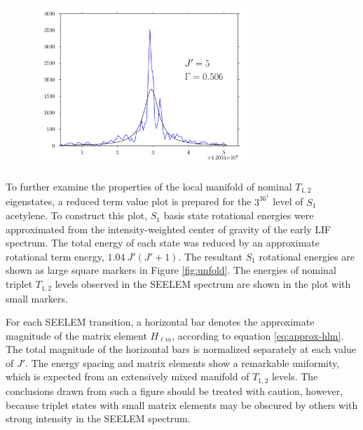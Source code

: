 \documentclass[12pt]{mitthesis}
\begin{document}
\begin{figure}
  \includegraphics[width=3.2in]{3361-q5-seelemfit}
\end{figure}


To further examine the properties of the local manifold of nominal
$T_{1,2}$ eigenstates, a reduced term value plot is prepared for the
$3^36^1$  level of $S_1$ acetylene.  To construct this plot,
$S_1$ basis state rotational energies were approximated from the
intensity-weighted center of gravity of the early LIF spectrum.  The
total energy of each state was reduced by an approximate rotational
term energy, $1.04 \: J'(J'+1)$.  The resultant $S_1$ rotational
energies are shown as large square markers in Figure \ref{fig:unfold}.
The energies of nominal triplet $T_{1,2}$ levels observed in the
SEELEM spectrum are shown in the plot with small markers.

For each SEELEM transition, a horizontal bar denotes the approximate
magnitude of the matrix element $H_{\ell m}$, according to equation
\ref{eq:approx-hlm}.  The total magnitude of the horizontal bars is
normalized separately at each value of $J'$.  The energy spacing and
matrix elements show a remarkable uniformity, which is expected from
an extensively mixed manifold of $T_{1,2}$ levels.  The conclusions
drawn from such a figure should be treated with caution, however,
because triplet states with small matrix elements may be obscured by
others with strong intensity in the SEELEM spectrum.


\end{document}
